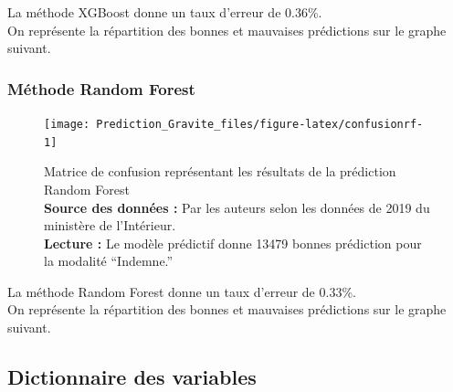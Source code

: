 \documentclass[french,]{tp}
\begin{document}
La méthode XGBoost donne un taux d'erreur de 0.36\%.\\
On représente la répartition des bonnes et mauvaises prédictions sur le graphe suivant.





\newpage

\hypertarget{muxe9thode-random-forest}{%
\subsubsection{Méthode Random Forest}\label{muxe9thode-random-forest}}

\begin{figure}[ht!]

{\centering \texttt{[image: Prediction\_Gravite\_files/figure-latex/confusionrf-1]} 

}

\caption{Matrice de confusion représentant les résultats de la prédiction Random Forest\\
\textbf{Source des données :} Par les auteurs selon les données de 2019 du ministère de l'Intérieur.\\
\textbf{Lecture :} Le modèle prédictif donne 13479 bonnes prédiction pour la modalité ``Indemne.''}\label{fig:confusionrf}
\end{figure}

La méthode Random Forest donne un taux d'erreur de 0.33\%.\\
On représente la répartition des bonnes et mauvaises prédictions sur le graphe suivant.





\newpage

\hypertarget{dictionnaire-des-variables}{%
\subsection{Dictionnaire des variables}\label{dictionnaire-des-variables}}
\end{document}
